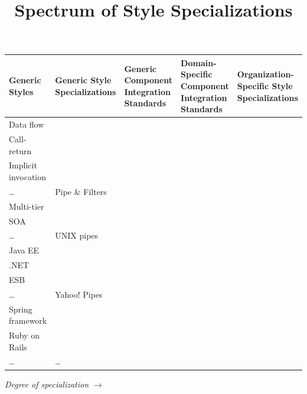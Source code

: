 \documentclass[11pt]{article}
\begin{document}
\title{Spectrum of Style Specializations}
\author{}
\date{}
\maketitle

\begin{table}[h!]
  \centering
  \small
  \begin{tabularx}{\textwidth}{lXXXX}
    \toprule
    \textbf{Generic Styles} &
    \textbf{Generic Style Specializations} &
    \textbf{Generic Component Integration Standards} &
    \textbf{Domain-Specific Component Integration Standards} &
    \textbf{Organization-Specific Style Specializations} \\
    \midrule
    Data flow\\
    Call-return\\
    Implicit invocation\\
    \dots
    &
    Pipe \& Filters\\
    Multi-tier\\
    SOA\\
    \dots
    &
    UNIX pipes\\
    Java EE\\
    .NET\\
    ESB\\
    \dots
    &
    Yahoo! Pipes\\
    Spring framework\\
    Ruby on Rails\\
    \dots
    &
    \dots \\
    \bottomrule
  \end{tabularx}
  \vspace{0.5em}

  \centering
  \textit{Degree of specialization} $\longrightarrow$
\end{table}
\end{document}
